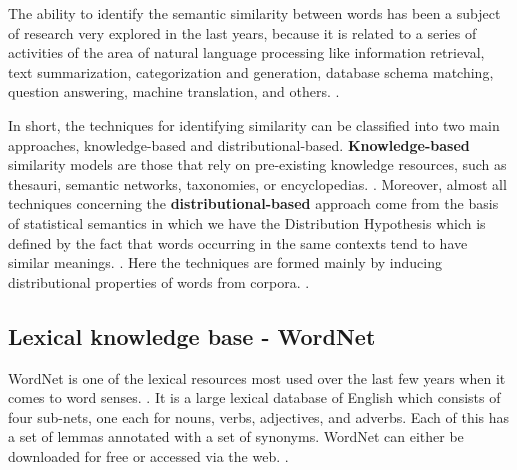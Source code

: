 
The ability to identify the semantic similarity between words has been a subject of research very explored in the last years, because it is related to a series of activities of the area of natural language processing like information retrieval, text summarization, categorization and generation, database schema matching, question answering, machine translation, and others. \cite{Islam2007ApplicationsOC, Jurafsky:2009:SLP:1214993}. 

In short, the techniques for identifying similarity can be classified into two main approaches, knowledge-based and distributional-based. \textbf{Knowledge-based} similarity models are those that rely on pre-existing knowledge resources, such as thesauri, semantic networks, taxonomies, or encyclopedias. \cite{Agirre2009}. Moreover, almost all techniques concerning the \textbf{distributional-based} approach come from the basis of statistical semantics in which we have the Distribution Hypothesis which is defined by the fact that words occurring in the same contexts tend to have similar meanings. \cite{Harris1954}. Here the techniques are formed mainly by inducing distributional properties of words from corpora. \cite{Agirre2009}.

\subsection{Lexical knowledge base - WordNet}\label{chap:background:wordnet}

WordNet is one of the lexical resources most used over the last few years when it comes to word senses. \cite{fellbaum1998}. It is a large lexical database of English which consists of four sub-nets, one each for nouns, verbs, adjectives, and adverbs. Each of this has a set of lemmas annotated with a set of synonyms. WordNet can either be downloaded for free or accessed via the web. \cite{wordnetOnline2010}.


